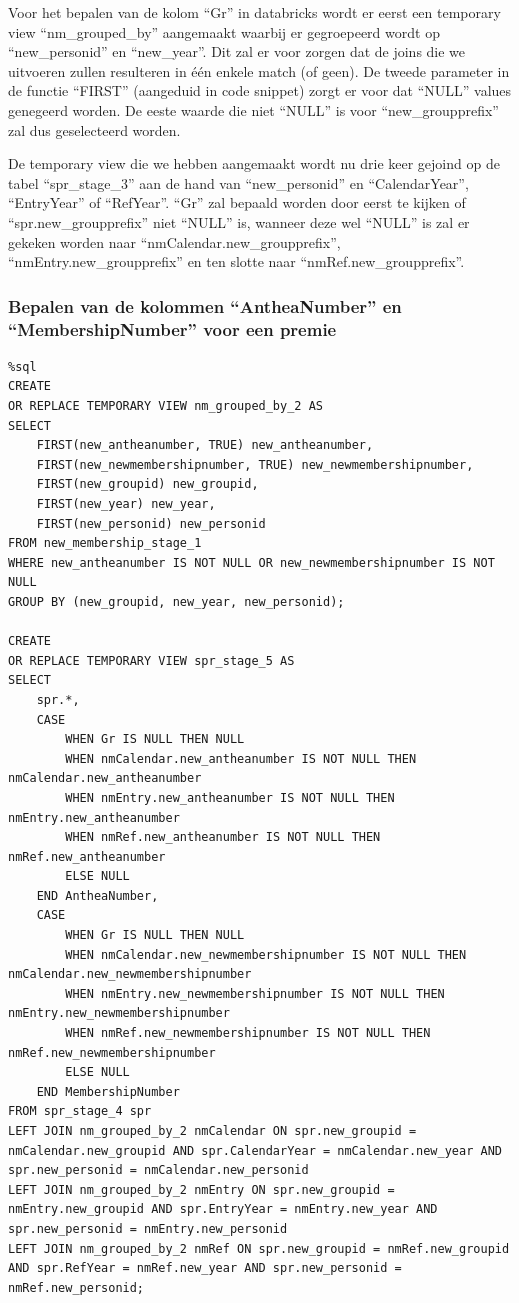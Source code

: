 Voor het bepalen van de kolom ``Gr'' in databricks wordt er eerst een temporary view ``nm\_grouped\_by'' aangemaakt waarbij er gegroepeerd wordt op ``new\_personid'' en ``new\_year''. Dit zal er voor zorgen dat de joins die we uitvoeren zullen resulteren in één enkele match (of geen). De tweede parameter in de functie ``FIRST'' (aangeduid in code snippet) zorgt er voor dat ``NULL'' values genegeerd worden. De eeste waarde die niet ``NULL'' is voor ``new\_groupprefix'' zal dus geselecteerd worden.

De temporary view die we hebben aangemaakt wordt nu drie keer gejoind op de tabel ``spr\_stage\_3'' aan de hand van ``new\_personid'' en ``CalendarYear'', ``EntryYear'' of ``RefYear''. ``Gr'' zal bepaald worden door eerst te kijken of ``spr.new\_groupprefix'' niet ``NULL'' is, wanneer deze wel ``NULL'' is zal er gekeken worden naar ``nmCalendar.new\_groupprefix'', ``nmEntry.new\_groupprefix'' en ten slotte naar ``nmRef.new\_groupprefix''.

\subsubsection{Bepalen van de kolommen ``AntheaNumber'' en ``MembershipNumber'' voor een premie}

\begin{verbatim}
%sql
CREATE
OR REPLACE TEMPORARY VIEW nm_grouped_by_2 AS
SELECT 
    FIRST(new_antheanumber, TRUE) new_antheanumber,
    FIRST(new_newmembershipnumber, TRUE) new_newmembershipnumber,
    FIRST(new_groupid) new_groupid, 
    FIRST(new_year) new_year,
    FIRST(new_personid) new_personid
FROM new_membership_stage_1
WHERE new_antheanumber IS NOT NULL OR new_newmembershipnumber IS NOT NULL
GROUP BY (new_groupid, new_year, new_personid);

CREATE 
OR REPLACE TEMPORARY VIEW spr_stage_5 AS 
SELECT
    spr.*,
    CASE
        WHEN Gr IS NULL THEN NULL
        WHEN nmCalendar.new_antheanumber IS NOT NULL THEN nmCalendar.new_antheanumber
        WHEN nmEntry.new_antheanumber IS NOT NULL THEN nmEntry.new_antheanumber
        WHEN nmRef.new_antheanumber IS NOT NULL THEN nmRef.new_antheanumber
        ELSE NULL
    END AntheaNumber,
    CASE
        WHEN Gr IS NULL THEN NULL
        WHEN nmCalendar.new_newmembershipnumber IS NOT NULL THEN nmCalendar.new_newmembershipnumber
        WHEN nmEntry.new_newmembershipnumber IS NOT NULL THEN nmEntry.new_newmembershipnumber
        WHEN nmRef.new_newmembershipnumber IS NOT NULL THEN nmRef.new_newmembershipnumber
        ELSE NULL
    END MembershipNumber
FROM spr_stage_4 spr
LEFT JOIN nm_grouped_by_2 nmCalendar ON spr.new_groupid = nmCalendar.new_groupid AND spr.CalendarYear = nmCalendar.new_year AND spr.new_personid = nmCalendar.new_personid
LEFT JOIN nm_grouped_by_2 nmEntry ON spr.new_groupid = nmEntry.new_groupid AND spr.EntryYear = nmEntry.new_year AND spr.new_personid = nmEntry.new_personid  
LEFT JOIN nm_grouped_by_2 nmRef ON spr.new_groupid = nmRef.new_groupid AND spr.RefYear = nmRef.new_year AND spr.new_personid = nmRef.new_personid;
\end{verbatim}

